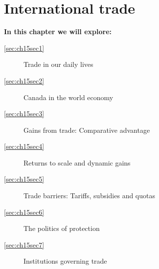 \chapter{International trade}\label{chap:internationaltrade}

\begin{topics}
	\textbf{In this chapter we will explore:}
	\begin{description}
		\item[\ref{sec:ch15sec1}] Trade in our daily lives
		\item[\ref{sec:ch15sec2}] Canada in the world economy
		\item[\ref{sec:ch15sec3}] Gains from trade: Comparative advantage
		\item[\ref{sec:ch15sec4}] Returns to scale and dynamic gains
		\item[\ref{sec:ch15sec5}] Trade barriers: Tariffs, subsidies and quotas
		\item[\ref{sec:ch15sec6}] The politics of protection
		\item[\ref{sec:ch15sec7}] Institutions governing trade
	\end{description}
\end{topics}